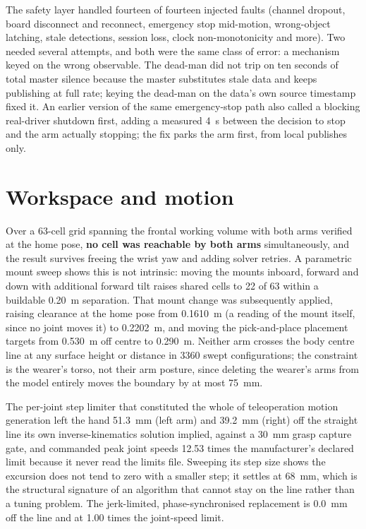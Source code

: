 The safety layer handled fourteen of fourteen injected faults (channel
dropout, board disconnect and reconnect, emergency stop mid-motion,
wrong-object latching, stale detections, session loss, clock
non-monotonicity and more). Two needed several attempts, and both were the
same class of error: a mechanism keyed on the wrong observable. The dead-man
did not trip on ten seconds of total master silence because the master
substitutes stale data and keeps publishing at full rate; keying the
dead-man on the data's own source timestamp fixed it. An earlier version of
the same emergency-stop path also called a blocking real-driver shutdown
first, adding a measured \SI{4}{\second} between the decision to stop and the
arm actually stopping; the fix parks the arm first, from local publishes
only.

\section{Workspace and motion}

Over a 63-cell grid spanning the frontal working volume with both arms
verified at the home pose, \textbf{no cell was reachable by both arms}
simultaneously, and the result survives freeing the wrist yaw and adding
solver retries. A parametric mount sweep shows this is not intrinsic: moving
the mounts inboard, forward and down with additional forward tilt raises
shared cells to 22 of 63 within a buildable \SI{0.20}{\metre} separation.
That mount change was subsequently applied, raising clearance at the home
pose from \SI{0.1610}{\metre} (a reading of the mount itself, since no joint
moves it) to \SI{0.2202}{\metre}, and moving the pick-and-place placement
targets from \SI{0.530}{\metre} off centre to \SI{0.290}{\metre}. Neither
arm crosses the body centre line at any surface height or distance in
\num{3360} swept configurations; the constraint is the wearer's torso, not
their arm posture, since deleting the wearer's arms from the model entirely
moves the boundary by at most \SI{75}{\milli\metre}.

The per-joint step limiter that constituted the whole of teleoperation
motion generation left the hand \SI{51.3}{\milli\metre} (left arm) and
\SI{39.2}{\milli\metre} (right) off the straight line its own
inverse-kinematics solution implied, against a \SI{30}{\milli\metre} grasp
capture gate, and commanded peak joint speeds \num{12.53} times the
manufacturer's declared limit because it never read the limits file. Sweeping
its step size shows the excursion does not tend to zero with a smaller step;
it settles at \SI{68}{\milli\metre}, which is the structural signature of an
algorithm that cannot stay on the line rather than a tuning problem. The
jerk-limited, phase-synchronised replacement is \SI{0.0}{\milli\metre} off
the line and at \num{1.00} times the joint-speed limit.

